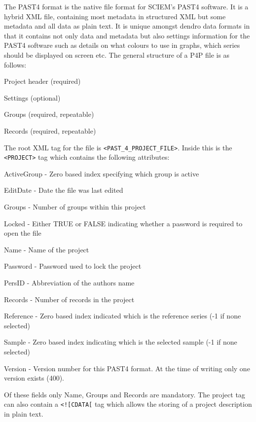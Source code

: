\documentclass[10pt, headsepline,DIV14,BCOR0.5cm]{scrreprt}
\begin{document}
The PAST4 format is the native file format for SCIEM's PAST4 software. It is a hybrid XML file, containing most metadata in structured XML but some metadata and all data as plain text. It is unique amongst dendro data formats in that it contains not only data and metadata but also settings information for the PAST4 software such as details on what colours to use in graphs, which series should be displayed on screen etc. The general structure of a P4P file is as follows:

\begin{itemize*}
    \item  Project header (required)
    \item  Settings (optional)
    \item  Groups (required, repeatable)
    \item  Records (required, repeatable) 
\end{itemize*}


The root XML tag for the file is \verb|<PAST_4_PROJECT_FILE>|. Inside this is the \verb|<PROJECT>| tag which contains the following attributes:

\begin{itemize*}
    \item  ActiveGroup - Zero based index specifying which group is active
    \item  EditDate - Date the file was last edited
    \item  Groups - Number of groups within this project
    \item  Locked - Either TRUE or FALSE indicating whether a password is required to open the file
    \item  Name - Name of the project
    \item  Password - Password used to lock the project
    \item  PersID - Abbreviation of the authors name
    \item  Records - Number of records in the project
    \item  Reference - Zero based index indicated which is the reference series (-1 if none selected)
    \item  Sample - Zero based index indicating which is the selected sample (-1 if none selected)
    \item  Version - Version number for this PAST4 format. At the time of writing only one version exists (400). 
\end{itemize*}

Of these fields only Name, Groups and Records are mandatory. The project tag can also contain a \verb|<![CDATA[| tag which allows the storing of a project description in plain text.
\end{document}
